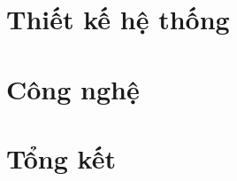 \documentclass[a4paper]{report}
\theoremstyle{definition}
\begin{document}
\chapter{Thiết kế hệ thống}
% 

\newpage
% 

\newpage
% 

\newpage


\newpage
% 

\newpage
% 


\chapter{Công nghệ}
% 


\chapter{Tổng kết}
% 




\end{document}

